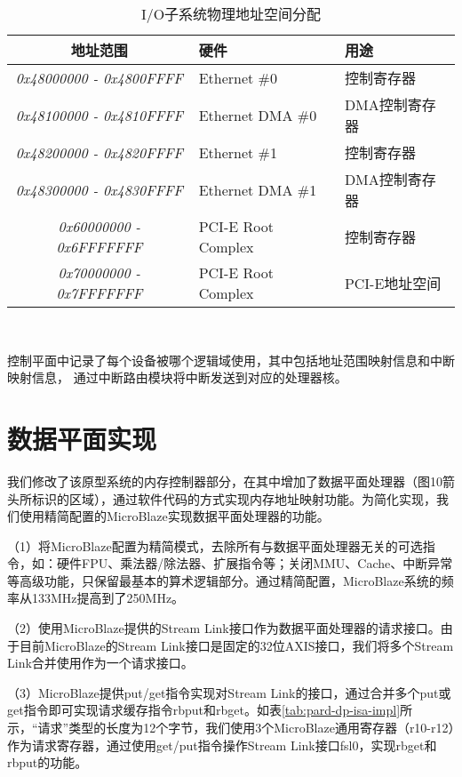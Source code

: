 \begin{table}[htb]
  \centering
  \begin{minipage}[t]{0.8\linewidth}
  \caption{I/O子系统物理地址空间分配}
  \label{tab:pard-io-phyaddr}
    \begin{tabular*}{\linewidth}{cll}
      \toprule[1.5pt]
      \textbf{地址范围} & \textbf{硬件} & \textbf{用途} \\
      \midrule[1pt]
      \textit{0x48000000 - 0x4800FFFF} & Ethernet \#0       & 控制寄存器    \\
      \textit{0x48100000 - 0x4810FFFF} & Ethernet DMA \#0   & DMA控制寄存器 \\
      \textit{0x48200000 - 0x4820FFFF} & Ethernet \#1       & 控制寄存器    \\
      \textit{0x48300000 - 0x4830FFFF} & Ethernet DMA \#1   & DMA控制寄存器 \\
      \textit{0x60000000 - 0x6FFFFFFF} & PCI-E Root Complex & 控制寄存器    \\
      \textit{0x70000000 - 0x7FFFFFFF} & PCI-E Root Complex & PCI-E地址空间 \\
      \bottomrule[1.5pt]
    \end{tabular*}\\[2pt]
  \end{minipage}
\end{table}

控制平面中记录了每个设备被哪个逻辑域使用，其中包括地址范围映射信息和中断映射信息，
通过中断路由模块将中断发送到对应的处理器核。


\section{数据平面实现}

我们修改了该原型系统的内存控制器部分，在其中增加了数据平面处理器（图10箭头所标识的区域），通过软件代码的方式实现内存地址映射功能。为简化实现，我们使用精简配置的MicroBlaze实现数据平面处理器的功能。

（1）将MicroBlaze配置为精简模式，去除所有与数据平面处理器无关的可选指令，如：硬件FPU、乘法器/除法器、扩展指令等；关闭MMU、Cache、中断异常等高级功能，只保留最基本的算术逻辑部分。通过精简配置，MicroBlaze系统的频率从133MHz提高到了250MHz。

（2）使用MicroBlaze提供的Stream Link接口作为数据平面处理器的请求接口。由于目前MicroBlaze的Stream Link接口是固定的32位AXIS接口，我们将多个Stream Link合并使用作为一个请求接口。

（3）MicroBlaze提供put/get指令实现对Stream Link的接口，通过合并多个put或get指令即可实现请求缓存指令rbput和rbget。如表\ref{tab:pard-dp-isa-impl}所示，``请求''类型的长度为12个字节，我们使用3个MicroBlaze通用寄存器（r10-r12）作为请求寄存器，通过使用get/put指令操作Stream Link接口fsl0，实现rbget和rbput的功能。

